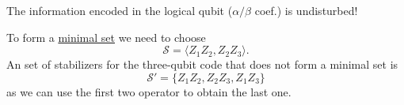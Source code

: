 The information encoded in the logical qubit ($\alpha/\beta$ coef.) is undisturbed!

To form a \hyperref[sec:basic.math.minimal_set]{minimal set} we need to choose
\begin{equation}
    \mathcal{S} = \langle Z_1 Z_2, Z_2 Z_3 \rangle.
\end{equation}
An set of stabilizers for the three-qubit code that does not form a minimal set is
\begin{equation}
    \mathcal{S}' = \{ Z_1 Z_2, Z_2 Z_3, Z_1 Z_3\}
\end{equation}
as we can use the first two operator to obtain the last one. 


